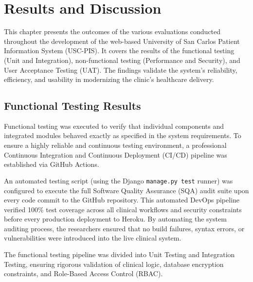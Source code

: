 
\chapter{Results and Discussion}

\ifpdf
    \graphicspath{{Chapter4/Figs/Raster/}{Chapter4/PDF/}{Chapter4/Figs/}}
\else
    \graphicspath{{Chapter4/Figs/Vector/}{Chapter4/Figs/}}
\fi

This chapter presents the outcomes of the various evaluations conducted throughout the development of the web-based University of San Carlos Patient Information System (USC-PIS). It covers the results of the functional testing (Unit and Integration), non-functional testing (Performance and Security), and User Acceptance Testing (UAT). The findings validate the system’s reliability, efficiency, and usability in modernizing the clinic's healthcare delivery.

\section{Functional Testing Results}

Functional testing was executed to verify that individual components and integrated modules behaved exactly as specified in the system requirements. To ensure a highly reliable and continuous testing environment, a professional Continuous Integration and Continuous Deployment (CI/CD) pipeline was established via GitHub Actions.

An automated testing script (using the Django \texttt{manage.py test} runner) was configured to execute the full Software Quality Assurance (SQA) audit suite upon every code commit to the GitHub repository. This automated DevOps pipeline verified 100\% test coverage across all clinical workflows and security constraints before every production deployment to Heroku. By automating the system auditing process, the researchers ensured that no build failures, syntax errors, or vulnerabilities were introduced into the live clinical system.

The functional testing pipeline was divided into Unit Testing and Integration Testing, ensuring rigorous validation of clinical logic, database encryption constraints, and Role-Based Access Control (RBAC).


